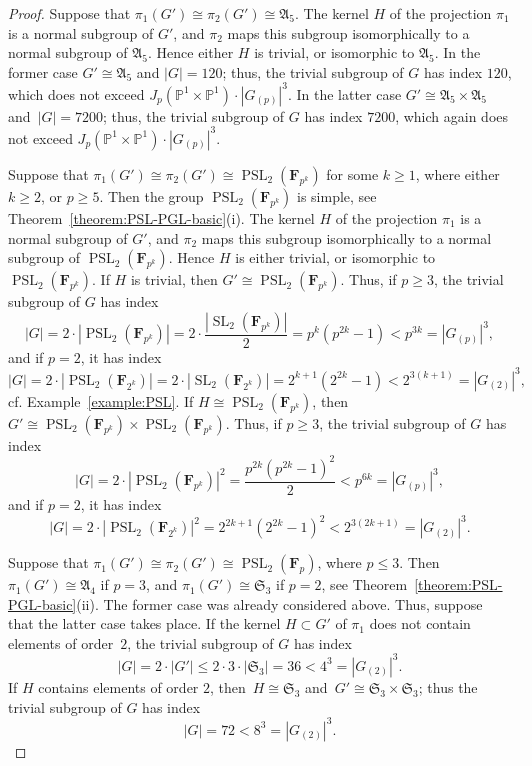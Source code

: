 \documentclass[12pt]{amsart}
\numberwithin{equation}{section}
\theoremstyle{definition}
\newcommand{\PP}{\mathbb P}
\DeclareMathOperator{\SL}{SL}
\DeclareMathOperator{\PSL}{PSL}
\def \ge {\geqslant}
\def \le {\leqslant}
\begin{document}
\begin{proof}
Suppose that $\pi_1(G')\cong\pi_2(G')\cong\mathfrak{A}_5$.
The kernel $H$ of the projection $\pi_1$ is a normal subgroup of $G'$, and $\pi_2$ maps this subgroup
isomorphically to a normal subgroup of $\mathfrak{A}_5$.
Hence either $H$ is trivial, or isomorphic to $\mathfrak{A}_5$. In the former case
$G'\cong\mathfrak{A}_5$ and $|G|=120$; thus, the trivial subgroup of $G$ has index $120$,
which does not exceed $J_p(\PP^1\times\PP^1)\cdot |G_{(p)}|^3$.
In the latter case $G'\cong\mathfrak{A}_5\times\mathfrak{A}_5$ and~\mbox{$|G|=7200$};
thus, the trivial subgroup of $G$ has index $7200$,
which again does not exceed $J_p(\PP^1\times\PP^1)\cdot |G_{(p)}|^3$.

Suppose that $\pi_1(G')\cong\pi_2(G')\cong\PSL_2(\mathbf{F}_{p^k})$ for some $k\ge 1$,
where either~\mbox{$k\ge 2$}, or $p\ge 5$. Then the group $\PSL_2(\mathbf{F}_{p^k})$ is simple, see Theorem~\ref{theorem:PSL-PGL-basic}(i).
The kernel $H$ of the projection $\pi_1$ is a normal subgroup of $G'$, and $\pi_2$ maps this subgroup
isomorphically to a normal subgroup of $\PSL_2(\mathbf{F}_{p^k})$.
Hence $H$ is either trivial, or isomorphic to $\PSL_2(\mathbf{F}_{p^k})$.
If $H$ is trivial, then $G'\cong\PSL_2(\mathbf{F}_{p^k})$.
Thus, if $p\ge 3$, the trivial subgroup of $G$ has index
$$
|G|=2\cdot |\PSL_2(\mathbf{F}_{p^k})|=2\cdot \frac{|\SL_2(\mathbf{F}_{p^k})|}{2}=p^k(p^{2k}-1)
<p^{3k}=|G_{(p)}|^3,
$$
and if $p=2$, it has
index
$$
|G|=2\cdot |\PSL_2(\mathbf{F}_{2^k})|=2\cdot|\SL_2(\mathbf{F}_{2^k})|=2^{k+1}(2^{2k}-1)<2^{3(k+1)}=
|G_{(2)}|^3,
$$
cf. Example~\ref{example:PSL}.
If $H\cong \PSL_2(\mathbf{F}_{p^k})$, then $G'\cong \PSL_2(\mathbf{F}_{p^k})\times\PSL_2(\mathbf{F}_{p^k})$.
Thus, if $p\ge 3$, the trivial subgroup of $G$ has index
$$
|G|=2\cdot |\PSL_2(\mathbf{F}_{p^k})|^2=\frac{p^{2k}(p^{2k}-1)^2}{2}
<p^{6k}=|G_{(p)}|^3,
$$
and if $p=2$, it has
index
$$
|G|=2\cdot |\PSL_2(\mathbf{F}_{2^k})|^2=2^{2k+1}(2^{2k}-1)^2<2^{3(2k+1)}=
|G_{(2)}|^3.
$$

Suppose that $\pi_1(G')\cong\pi_2(G')\cong\PSL_2(\mathbf{F}_{p})$,
where $p\le 3$. Then $\pi_1(G')\cong \mathfrak{A}_4$ if $p=3$, and
$\pi_1(G')\cong \mathfrak{S}_3$ if $p=2$, see
Theorem~\ref{theorem:PSL-PGL-basic}(ii).
The former case was already considered above.
Thus, suppose that the latter case takes place.
If the kernel $H\subset G'$ of $\pi_1$ does not contain elements of order~$2$,
the trivial subgroup of $G$ has index
$$
|G|=2\cdot |G'|\le 2\cdot 3\cdot |\mathfrak{S}_3|=36<4^3=|G_{(2)}|^3.
$$
If $H$ contains elements of order $2$, then~\mbox{$H\cong\mathfrak{S}_3$}
and~\mbox{$G'\cong \mathfrak{S}_3\times\mathfrak{S}_3$}; thus
the trivial subgroup of $G$ has index
$$
|G|=72<8^3=|G_{(2)}|^3.
$$



\end{proof}
\end{document}
